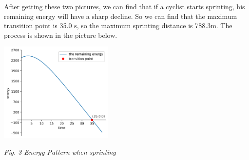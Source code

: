 \documentclass{article}
\begin{document}
	After getting these two pictures, we can find that if a cyclist starts sprinting, his remaining energy will have a sharp decline. So we can find that the maximum transition point is 35.0 $\mathrm{s}$, so the maximum sprinting distance is 788.3$\mathrm{m}$. The process is shown in the picture below.
	\begin{center}
		\includegraphics[height=5cm]{3.png}

		\small \textit{Fig. 3 Energy Pattern when sprinting}
	\end{center}
\end{document}
